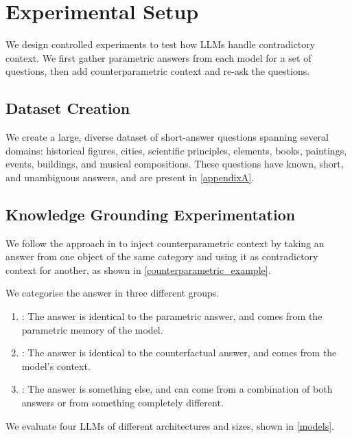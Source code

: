 \section{Experimental Setup}

We design controlled experiments to test how LLMs handle contradictory context.
We first gather parametric answers from each model for a set of questions, then add counterparametric context and re-ask the questions.

\subsection{Dataset Creation}
We create a large, diverse dataset of short-answer questions spanning several domains: historical figures, cities, scientific principles, elements, books, paintings, events, buildings, and musical compositions.
These questions have known, short, and unambiguous answers, and are present in \cref{appendixA}.


\subsection{Knowledge Grounding Experimentation}


We follow the approach in \citet{factual_recall} to inject counterparametric context by taking an answer from one object of the same category and using it as contradictory context for another, as shown in \cref{counterparametric_example}.

We categorise the answer in three different groups. 
\begin{enumerate}
	\item \Parametric{}: The answer is identical to the parametric answer, and comes from the parametric memory of the model.
	\item \Contextual{}: The answer is identical to the counterfactual answer, and comes from the model's context.
	\item \Other{}: The answer is something else, and can come from a combination of both answers or from something completely different.
\end{enumerate}

We evaluate four LLMs of different architectures and sizes, shown in \cref{models}.

